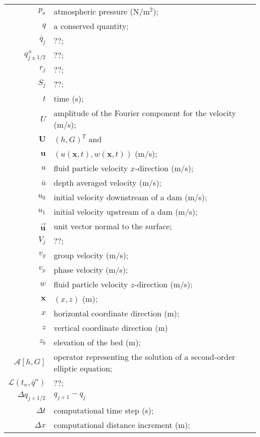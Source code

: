 \documentclass[SingleSpace,12pt]{Serre_ASCE}
\begin{document}
\begin{longtable}{r  @{\hspace{1em}=\hspace{1em}}  l}
$p_a$                  & atmospheric pressure (N/m$^2$); \\
$q$                    & a conserved quantity; \\
$\bar{q}_j$            & ??; \\
$q_{j \pm 1/2}^\pm$    & ??; \\
$r_j$                  & ??; \\
$S_j$                  & ??; \\
$t$                    & time (s); \\
$U$                    & amplitude of the Fourier component for the velocity (m/s);\\
$\mathbf{U}$           & $(h,G)^T$  and \\
$\mathbf{u}$           & $(u(\mathbf{x},t),w(\mathbf{x},t))$ (m/s); \\
$u$                    & fluid particle velocity $x$-direction (m/s); \\
$\bar{u}$              & depth averaged velocity (m/s); \\
$u_0$                  & initial velocity  downstream of a dam (m/s); \\
$u_1$                  & initial velocity upstream of a dam (m/s); \\
$\vec{\mathbf{u}}$     & unit vector normal to the surface; \\
$V_j$                  & ??; \\
$v_g$                  & group velocity (m/s); \\
$v_p$                  & phase velocity (m/s); \\
$w$                    & fluid particle velocity $z$-direction (m/s); \\
$\mathbf{x}$           & $(x,z)$ (m); \\
$x$                    & horizontal coordinate direction (m); \\
$z$                    & vertical coordinate direction (m) \\
$z_b$                  & elevation of the bed (m); \\
$\mathcal{A}[h,G]$     & operator representing the solution of a second-order elliptic equation; \\
$\mathcal{L}(t_n,\bar{q}^n)$ & ??; \\
$\Delta q_{j+1/2}$     & $q_{j+1} - q_j$ \\
$\Delta t$             & computational time step (s); \\
$\Delta x$             & computational distance increment (m); \\

\end{longtable}
\end{document}
